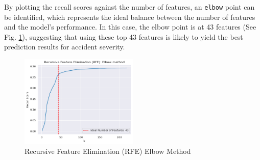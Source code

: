 By plotting the recall scores against the number of features, an \verb|elbow| point can be identified, which represents the ideal balance between the number of features and the model's performance.
In this case, the elbow point is at 43 features (See Fig. \ref{fig:recursive_feature_elimination}), suggesting that using these top 43 features is likely to yield the best prediction results for accident severity.

\begin{figure}[ht]
    \centering
    \includegraphics[width=0.5\textwidth]{images/Figure_Recursive Feature Elimination}
    \caption{Recursive Feature Elimination (RFE) Elbow Method}
    \label{fig:recursive_feature_elimination}
\end{figure}
